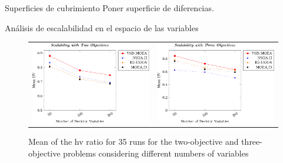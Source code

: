 \documentclass{beamer}
\newcommand{\HV}{{\sc hv}}
\begin{document}
\begin{frame}{Superficies de cubrimiento}
Poner superficie de diferencias.
\end{frame}

\begin{frame}{Análisis de escalabilidad en el espacio de las variables}
\begin{figure}
\centering
\begin{tabular}{cc}
\includegraphics[scale=0.6]{Images/Graphic-Scalability-2obj_tikz-figure0.eps} & \includegraphics[scale=0.6]{Images/Graphic-Scalability-3obj_tikz-figure0.eps}
\end{tabular}
\caption{Mean of the \HV{} ratio for 35 runs for the two-objective and three-objective problems considering different numbers of variables}
\end{figure}
\end{frame}
\end{document}
